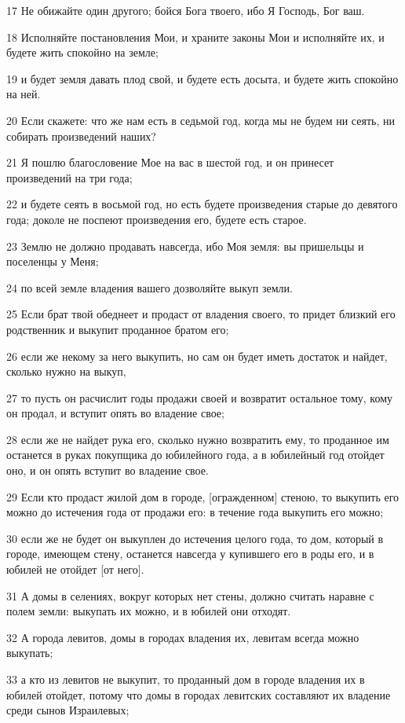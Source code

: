 \par 17 Не обижайте один другого; бойся Бога твоего, ибо Я Господь, Бог ваш.
\par 18 Исполняйте постановления Мои, и храните законы Мои и исполняйте их, и будете жить спокойно на земле;
\par 19 и будет земля давать плод свой, и будете есть досыта, и будете жить спокойно на ней.
\par 20 Если скажете: что же нам есть в седьмой год, когда мы не будем ни сеять, ни собирать произведений наших?
\par 21 Я пошлю благословение Мое на вас в шестой год, и он принесет произведений на три года;
\par 22 и будете сеять в восьмой год, но есть будете произведения старые до девятого года; доколе не поспеют произведения его, будете есть старое.
\par 23 Землю не должно продавать навсегда, ибо Моя земля: вы пришельцы и поселенцы у Меня;
\par 24 по всей земле владения вашего дозволяйте выкуп земли.
\par 25 Если брат твой обеднеет и продаст от владения своего, то придет близкий его родственник и выкупит проданное братом его;
\par 26 если же некому за него выкупить, но сам он будет иметь достаток и найдет, сколько нужно на выкуп,
\par 27 то пусть он расчислит годы продажи своей и возвратит остальное тому, кому он продал, и вступит опять во владение свое;
\par 28 если же не найдет рука его, сколько нужно возвратить ему, то проданное им останется в руках покупщика до юбилейного года, а в юбилейный год отойдет оно, и он опять вступит во владение свое.
\par 29 Если кто продаст жилой дом в городе, [огражденном] стеною, то выкупить его можно до истечения года от продажи его: в течение года выкупить его можно;
\par 30 если же не будет он выкуплен до истечения целого года, то дом, который в городе, имеющем стену, останется навсегда у купившего его в роды его, и в юбилей не отойдет [от него].
\par 31 А домы в селениях, вокруг которых нет стены, должно считать наравне с полем земли: выкупать их можно, и в юбилей они отходят.
\par 32 А города левитов, домы в городах владения их, левитам всегда можно выкупать;
\par 33 а кто из левитов не выкупит, то проданный дом в городе владения их в юбилей отойдет, потому что домы в городах левитских составляют их владение среди сынов Израилевых;
